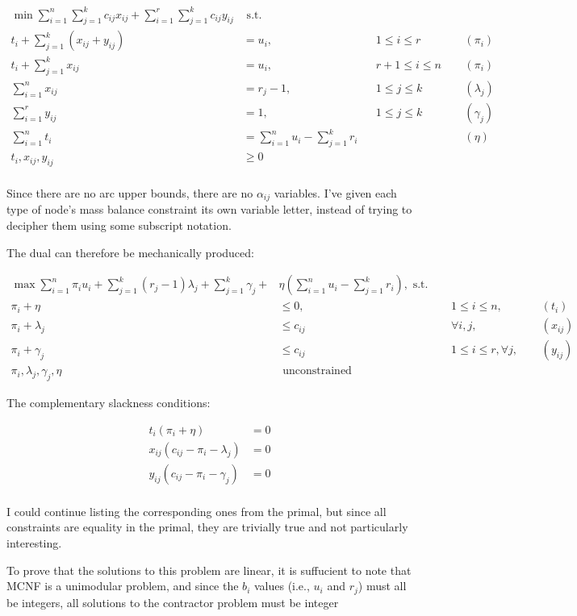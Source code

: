 \documentclass[fleqn]{homework}
\begin{document}
\begin{problem}{2}
    \begin{alignat*}{5}
      \min \sum_{i=1}^n \sum_{j=1}^k c_{ij} x_{ij} + \sum_{i=1}^r \sum_{j=1}^k c_{ij} y_{ij} & \text{ s.t.} \\
      t_i + \sum_{j=1}^k (x_{ij} + y_{ij}) &= u_i, && 1 \le i \le r && (\pi_i)\\
      t_i + \sum_{j=1}^k x_{ij} &= u_i,   &&r+1 \le i \le n \:\:  && (\pi_i)\\
      \sum_{i=1}^n x_{ij} &= r_j - 1,  && 1 \le j \le k && (\lambda_j)\\
      \sum_{i=1}^r y_{ij} &= 1, && 1 \le j \le k && (\gamma_j)\\
      \sum_{i=1}^n t_i &= \sum_{i=1}^n u_i - \sum_{j=1}^k r_i  && && (\eta)\\
      t_i, x_{ij}, y_{ij} &\ge 0  &&\\
    \end{alignat*}

    Since there are no arc upper bounds, there are no $\alpha_{ij}$ variables.
    I've given each type of node's mass balance constraint its own variable
    letter, instead of trying to decipher them using some subscript notation.

    The dual can therefore be mechanically produced:

    \begin{alignat*}{5}
      \max \sum_{i=1}^n \pi_i u_i + \sum_{j=1}^k (r_j-1) \lambda_j + \sum_{j=1}^k \gamma_j + &\eta \left(\sum_{i=1}^n u_i - \sum_{j=1}^k r_i\right), \text{ s.t.} \\
      \pi_i + \eta &\le 0, && \:\: 1 \le i \le n, \:\: && (t_i) \\
      \pi_i + \lambda_j &\le c_{ij} && \:\: \forall i,j, \:\: && (x_{ij}) \\
      \pi_i + \gamma_j &\le c_{ij} && \:\: 1 \le i \le r, \forall j, \:\: && (y_{ij}) \\
      \pi_i, \lambda_j, \gamma_j, \eta &\text{ unconstrained}
    \end{alignat*}

    The complementary slackness conditions:

    \begin{align*}
      t_i(\pi_i + \eta) &= 0 \\
      x_{ij} (c_{ij} - \pi_i - \lambda_j) &= 0 \\
      y_{ij} (c_{ij} - \pi_i - \gamma_j) &= 0 \\
    \end{align*}

    I could continue listing the corresponding ones from the primal, but since
    all constraints are equality in the primal, they are trivially true and not
    particularly interesting.

    To prove that the solutions to this problem are linear, it is suffucient to
    note that MCNF is a unimodular problem, and since the $b_i$ values (i.e.,
    $u_i$ and $r_j$) must all be integers, all solutions to the contractor
    problem must be integer
  \end{problem}
\end{document}
